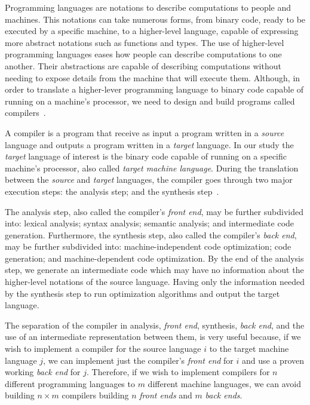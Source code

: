 \documentclass[english, lmodern, oneside, embeddedlogo]{ufsc-thesis-rn46-2019}
\begin{document}
Programming languages are notations to describe computations to people and machines.
This notations can take numerous forms, from binary code, ready to be executed by a specific machine, to a higher-level language, capable of expressing more abstract notations such as functions and types.
The use of higher-level programming languages eases how people can describe computations to one another.
Their abstractions are capable of describing computations without needing to expose details from the machine that will execute them.
Although, in order to translate a higher-lever programming language to binary code capable of running on a machine's processor, we need to design and build programs called compilers~\cite{Aho:2006:CPT:1177220}.

A compiler is a program that receive as input a program written in a \textit{source} language and outputs a program written in a \textit{target} language.
In our study the \textit{target} language of interest is the binary code capable of running on a specific machine's processor, also called \textit{target machine language}.
During the translation between the \textit{source} and \textit{target} languages, the compiler goes through two major execution steps: the analysis step; and the synthesis step~\cite{Aho:2006:CPT:1177220}.

The analysis step, also called the compiler's \textit{front end}, may be further subdivided into: lexical analysis; syntax analysis; semantic analysis; and intermediate code generation.
Furthermore, the synthesis step, also called the compiler's \textit{back end}, may be further subdivided into: machine-independent code optimization; code generation; and machine-dependent code optimization.
By the end of the analysis step, we generate an intermediate code which may have no information about the higher-level notations of the source language.
Having only the information needed by the synthesis step to run optimization algorithms and output the target language.

The separation of the compiler in analysis, \textit{front end}, synthesis, \textit{back end}, and the use of an intermediate representation between them, is very useful because, if we wish to implement a compiler for the source language $i$ to the target machine language $j$, we can implement just the compiler's \textit{front end} for $i$ and use a proven working \textit{back end} for $j$.
Therefore, if we wish to implement compilers for $n$ different programming languages to $m$ different machine languages, we can avoid building $n \times m$ compilers building $n$ \textit{front ends} and $m$ \textit{back ends}.
\end{document}
